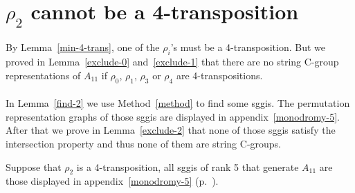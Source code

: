 \section{$\rho_2$ cannot be a 4-transposition}

\paragraph{}
By Lemma~\ref{min-4-trans}, one of the $\rho_i$'s must be a 4-transposition. But we proved in Lemma~\ref{exclude-0} and~\ref{exclude-1} that there are no string C-group representations of $A_{11}$ if $\rho_0$, $\rho_1$, $\rho_3$ or $\rho_4$ are 4-transpositions.

\paragraph{}
In Lemma~\ref{find-2} we use Method~\ref{method} to find some sggis. The permutation representation graphs of those sggis are displayed in appendix~\ref{monodromy-5}. After that we prove in Lemma~\ref{exclude-2} that none of those sggis satisfy the intersection property and thus none of them are string C-groups.

\begin{lemma}
  \label{find-2}
  Suppose that $\rho_2$ is a 4-transposition, all sggis of rank 5 that generate $A_{11}$ are those displayed in appendix~\ref{monodromy-5} (p.~\pageref{monodromy-5}).
\end{lemma}

